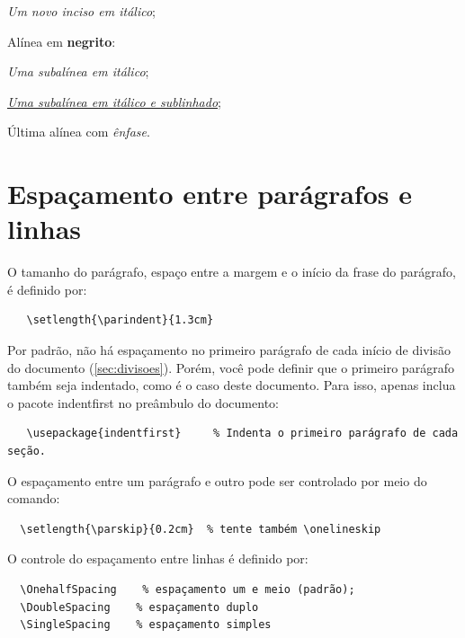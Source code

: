 \begin{alineas}
	\begin{incisos}
		\item \textit{Um novo inciso em itálico};
	\end{incisos}

	\item Alínea em \textbf{negrito}:

	\begin{subalineas}
		\item \textit{Uma subalínea em itálico};
		\item \underline{\textit{Uma subalínea em itálico e sublinhado}};
	\end{subalineas}

	\item Última alínea com \emph{ênfase}.

\end{alineas}

\section{Espaçamento entre parágrafos e linhas}%
O tamanho do parágrafo, espaço entre a margem
e o início da frase do parágrafo, é definido por:

\begin{verbatim}
   \setlength{\parindent}{1.3cm}
\end{verbatim}%
Por padrão, não há espaçamento no
primeiro parágrafo de cada início de divisão do documento
(\cref{sec:divisoes}). Porém, você pode definir que o primeiro parágrafo
também seja indentado, como é o caso deste documento. Para isso, apenas inclua o
pacote \textsf{indentfirst} no preâmbulo do documento:

\begin{verbatim}
   \usepackage{indentfirst}     % Indenta o primeiro parágrafo de cada seção.
\end{verbatim}%
O espaçamento entre um parágrafo e outro
pode ser controlado por meio do comando:

\begin{verbatim}
  \setlength{\parskip}{0.2cm}  % tente também \onelineskip
\end{verbatim}%
O controle do espaçamento entre linhas é
definido por:

\begin{verbatim}
  \OnehalfSpacing    % espaçamento um e meio (padrão);
  \DoubleSpacing    % espaçamento duplo
  \SingleSpacing    % espaçamento simples
\end{verbatim}

